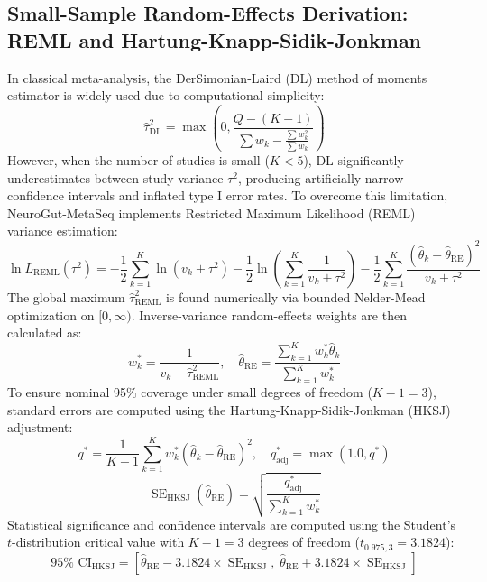 \documentclass[10pt,a4paper]{article}
\begin{document}
\subsection{Small-Sample Random-Effects Derivation: REML and Hartung-Knapp-Sidik-Jonkman}
In classical meta-analysis, the DerSimonian-Laird (DL) method of moments estimator is widely used due to computational simplicity:
\begin{equation}
\hat{\tau}^2_{\text{DL}} = \max\left(0, \frac{Q - (K - 1)}{\sum w_k - \frac{\sum w_k^2}{\sum w_k}}\right)
\end{equation}
However, when the number of studies is small ($K < 5$), DL significantly underestimates between-study variance $\tau^2$, producing artificially narrow confidence intervals and inflated type I error rates. To overcome this limitation, NeuroGut-MetaSeq implements Restricted Maximum Likelihood (REML) variance estimation:
\begin{equation}
\ln L_{\text{REML}}(\tau^2) = -\frac{1}{2}\sum_{k=1}^K \ln(v_k + \tau^2) - \frac{1}{2}\ln\left(\sum_{k=1}^K \frac{1}{v_k + \tau^2}\right) - \frac{1}{2}\sum_{k=1}^K \frac{(\hat{\theta}_k - \hat{\theta}_{\text{RE}})^2}{v_k + \tau^2}
\end{equation}
The global maximum $\hat{\tau}^2_{\text{REML}}$ is found numerically via bounded Nelder-Mead optimization on $[0, \infty)$. Inverse-variance random-effects weights are then calculated as:
\begin{equation}
w_k^* = \frac{1}{v_k + \hat{\tau}^2_{\text{REML}}}, \quad \hat{\theta}_{\text{RE}} = \frac{\sum_{k=1}^K w_k^* \hat{\theta}_k}{\sum_{k=1}^K w_k^*}
\end{equation}
To ensure nominal 95\% coverage under small degrees of freedom ($K - 1 = 3$), standard errors are computed using the Hartung-Knapp-Sidik-Jonkman (HKSJ) adjustment:
\begin{equation}
q^* = \frac{1}{K - 1}\sum_{k=1}^K w_k^* (\hat{\theta}_k - \hat{\theta}_{\text{RE}})^2, \quad q_{\text{adj}}^* = \max(1.0, q^*)
\end{equation}
\begin{equation}
\operatorname{SE}_{\text{HKSJ}}(\hat{\theta}_{\text{RE}}) = \sqrt{\frac{q_{\text{adj}}^*}{\sum_{k=1}^K w_k^*}}
\end{equation}
Statistical significance and confidence intervals are computed using the Student's $t$-distribution critical value with $K - 1 = 3$ degrees of freedom ($t_{0.975, 3} = 3.1824$):
\begin{equation}
95\% \text{ CI}_{\text{HKSJ}} = \left[ \hat{\theta}_{\text{RE}} - 3.1824 \times \operatorname{SE}_{\text{HKSJ}}, \; \hat{\theta}_{\text{RE}} + 3.1824 \times \operatorname{SE}_{\text{HKSJ}} \right]
\end{equation}
\end{document}
